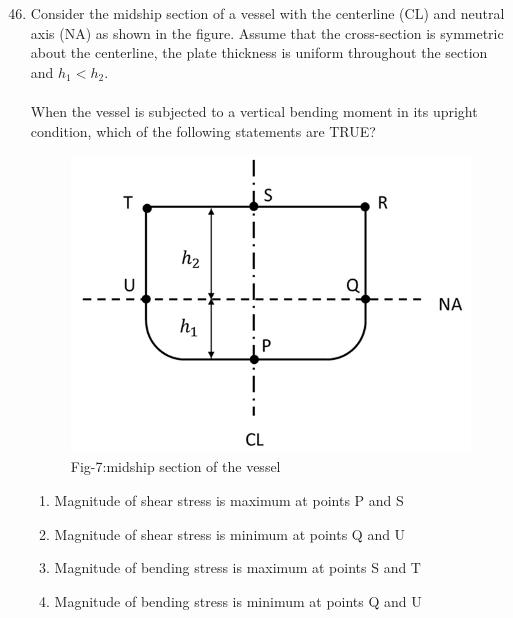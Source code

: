 \documentclass[journal]{IEEEtran}
\theoremstyle{remark}
\begin{document}
\begin{enumerate}[itemsep=1em]
\setcounter{enumi}{45}
\item Consider the midship section of a vessel with the centerline (CL) and neutral axis (NA) as shown in the figure. Assume that the cross-section is symmetric about the centerline, the plate thickness is uniform throughout the section and $h_1<h_2$.\\
\\
When the vessel is subjected to a vertical bending moment in its upright condition, which of the following statements are TRUE?
\begin{figure}[H]
    \centering
    \includegraphics[width=0.4\columnwidth]{figs/fig-7.jpeg}
    \caption*{Fig-7:midship section of the vessel}
    \label{fig-7}
\end{figure}
\begin{enumerate}[leftmargin=2.5em, labelsep=0.5em, itemsep=0.5em]
    \item Magnitude of shear stress is maximum at points P and S 
    \item Magnitude of shear stress is minimum at points Q and U 
    \item Magnitude of bending stress is maximum at points S and T 
    \item Magnitude of bending stress is minimum at points Q and U 
\end{enumerate}
\end{enumerate}

\newpage
\vspace*{0.25cm}
\end{document}
